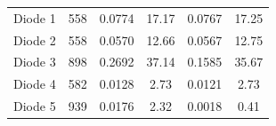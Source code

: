 \begin{tabular}{lSSSSS}
\toprule
{} & {} & {} & {} & {} & {} \\
\midrule
Diode 1 & 558 & 0.0774 & 17.17 & 0.0767 & 17.25 \\
Diode 2 & 558 & 0.0570 & 12.66 & 0.0567 & 12.75 \\
Diode 3 & 898 & 0.2692 & 37.14 & 0.1585 & 35.67 \\
Diode 4 & 582 & 0.0128 & 2.73 & 0.0121 & 2.73 \\
Diode 5 & 939 & 0.0176 & 2.32 & 0.0018 & 0.41 \\
\bottomrule
\end{tabular}

